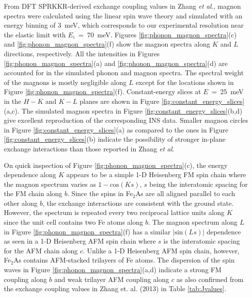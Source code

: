 \documentclass[10pt,doublespacing,edeposit]{uiucthesis2020}
\begin{document}
\begin{mainmatter}
From DFT SPRKKR-derived exchange coupling values in Zhang \emph{et al}.,\cite{Zhang2013} magnon spectra were calculated using the linear spin wave theory and simulated with an energy binning of 3~meV, which corresponds to our experimental resolution near the elastic limit with $E_i$~=~70~meV. Figures \ref{fig:phonon_magnon_spectra}(c) and \ref{fig:phonon_magnon_spectra}(f) show the magnon spectra along $K$ and $L$ directions, respectively. All the intensities in Figures \ref{fig:phonon_magnon_spectra}(a) and \ref{fig:phonon_magnon_spectra}(d) are accounted for in the simulated phonon and magnon spectra. The spectral weight of the magnons is mostly negligible along $L$ except for the locations shown in Figure \ref{fig:phonon_magnon_spectra}(f). Constant-energy slices at $E$~=~25~meV in the $H-K$ and $K-L$ planes are shown in Figure \ref{fig:constant_energy_slices}(a,c). The simulated magnon spectra in Figure \ref{fig:constant_energy_slices}(b,d) give excellent reproduction of the corresponding INS data. Smaller magnon circles in Figure \ref{fig:constant_energy_slices}(a) as compared to the ones in Figure \ref{fig:constant_energy_slices}(b) indicate the possibility of stronger in-plane exchange interactions than those reported in Zhang \emph{et al}.\cite{Zhang2013}


On quick inspection of Figure \ref{fig:phonon_magnon_spectra}(c), the energy dependence along $K$ appears to be a simple 1-D Heisenberg FM spin chain where the magnon spectrum varies as $1 - \textrm{cos} (Ks)$,\cite{Stancil} $s$ being the interatomic spacing for the FM chain along $b$. Since the spins in Fe$_2$As are all aligned parallel to each other along $b$, the exchange interactions are consistent with the ground state. However, the spectrum is repeated every two reciprocal lattice units along $K$ since the unit cell contains two Fe atoms along $b$. The magnon spectrum along $L$ in Figure \ref{fig:phonon_magnon_spectra}(f) has a similar $|\textrm{sin}(Ls)|$ dependence as seen in a 1-D Heisenberg AFM spin chain where $s$ is the interatomic spacing for the AFM chain along $c$. Unlike a 1-D Heisenberg AFM spin chain, however, Fe$_2$As contains AFM-stacked trilayers of Fe atoms. 
The dispersion of the spin waves in Figure \ref{fig:phonon_magnon_spectra}(a,d) indicate a strong FM coupling along $b$ and weak trilayer AFM coupling along $c$ as also confirmed from the exchange coupling values in Zhang et. al. (2013)\cite{Zhang2013} in Table \ref{tab:Jvalues}.



\end{mainmatter}
\end{document}
